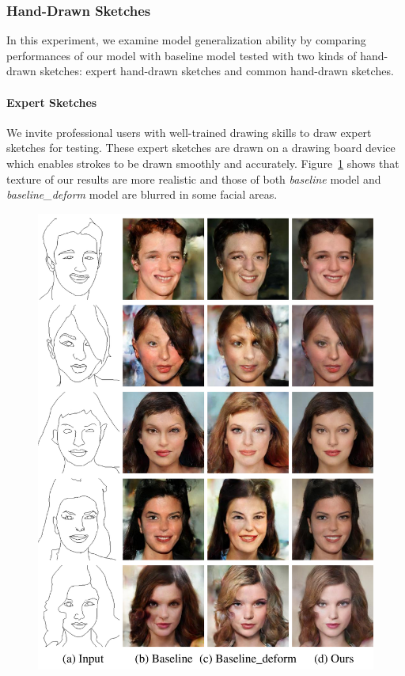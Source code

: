 \subsubsection{Hand-Drawn Sketches}
In this experiment, we examine model generalization ability by comparing performances of our model with baseline model tested with two kinds of hand-drawn sketches: expert hand-drawn sketches and common hand-drawn sketches.

\paragraph{Expert Sketches}
We invite professional users with well-trained drawing skills to draw expert sketches for testing. These expert sketches are drawn on a drawing board device which enables strokes to be drawn smoothly and accurately. Figure~\ref{fig:expert_sketches} shows that texture of our results are more realistic and those of both \textit{baseline} model and \textit{baseline\_deform} model are blurred in some facial areas. 

\begin{figure}
	\includegraphics[width=0.9\linewidth]{figs/expertsketches}
	\caption{}
	\label{fig:expert_sketches}
\end{figure}


